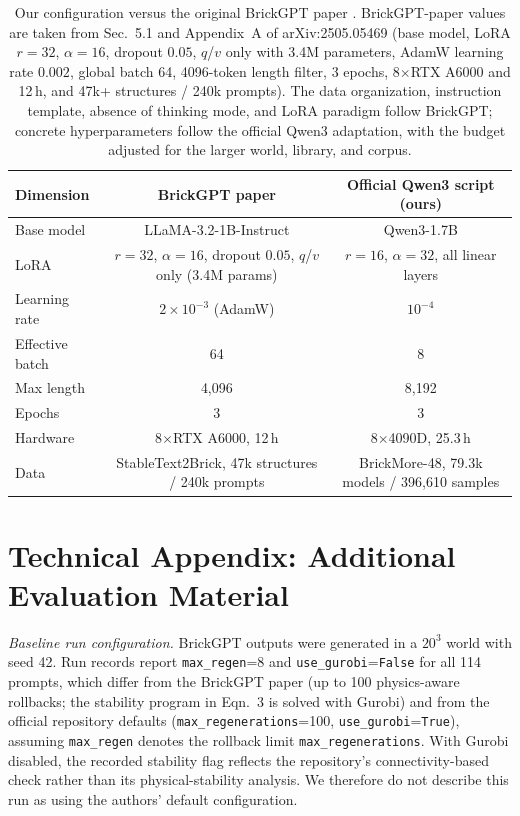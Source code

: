 \documentclass[letterpaper]{article} %
\begin{document}
\begin{table}[!htbp]
\centering
\small
\setlength{\tabcolsep}{5pt}
\begin{tabular}{lcc}
\toprule
Dimension & BrickGPT paper & Official Qwen3 script (ours) \\
\midrule
Base model & LLaMA-3.2-1B-Instruct & Qwen3-1.7B \\
LoRA & $r=32$, $\alpha=16$, dropout $0.05$, $q$/$v$ only (3.4M params) & $r=16$, $\alpha=32$, all linear layers \\
Learning rate & $2{\times}10^{-3}$ (AdamW) & $10^{-4}$ \\
Effective batch & 64 & 8 \\
Max length & 4,096 & 8,192 \\
Epochs & 3 & 3 \\
Hardware & 8$\times$RTX A6000, 12\,h & 8$\times$4090D, 25.3\,h \\
Data & StableText2Brick, 47k structures / 240k prompts & BrickMore-48, 79.3k models / 396,610 samples \\
\bottomrule
\end{tabular}
\caption{Our configuration versus the original BrickGPT paper \cite{brickgpt}. BrickGPT-paper values are taken from Sec.~5.1 and Appendix~A of arXiv:2505.05469 (base model, LoRA $r{=}32$, $\alpha{=}16$, dropout $0.05$, $q$/$v$ only with 3.4M parameters, AdamW learning rate $0.002$, global batch 64, 4096-token length filter, 3 epochs, 8$\times$RTX A6000 and 12\,h, and 47k+ structures / 240k prompts). The data organization, instruction template, absence of thinking mode, and LoRA paradigm follow BrickGPT; concrete hyperparameters follow the official Qwen3 adaptation, with the budget adjusted for the larger world, library, and corpus.}
\label{tab:brickgpt-recipe}
\end{table}

\FloatBarrier
\section{Technical Appendix: Additional Evaluation Material}
\label{app:eval}

\emph{Baseline run configuration.} BrickGPT outputs were generated in a $20^3$ world with seed 42. Run records report \texttt{max\_regen}=8 and \texttt{use\_gurobi}=\texttt{False} for all 114 prompts, which differ from the BrickGPT paper (up to 100 physics-aware rollbacks; the stability program in Eqn.~3 is solved with Gurobi) and from the official repository defaults (\texttt{max\_regenerations}=100, \texttt{use\_gurobi}=\texttt{True}), assuming \texttt{max\_regen} denotes the rollback limit \texttt{max\_regenerations}. With Gurobi disabled, the recorded stability flag reflects the repository's connectivity-based check rather than its physical-stability analysis. We therefore do not describe this run as using the authors' default configuration.
\end{document}
